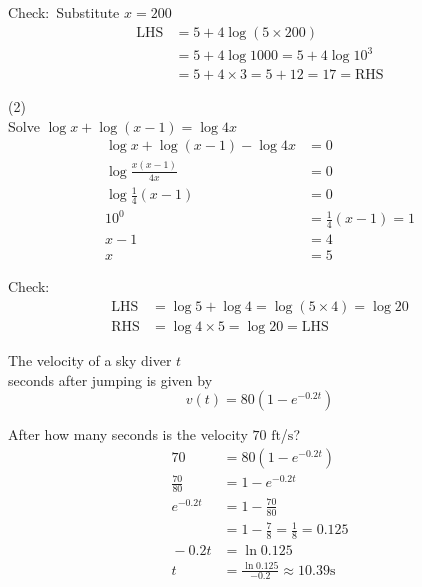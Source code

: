 Check:\ Substitute $x =200$
\begin{align*}\text{LHS} &  = 5 +4 \log  \left (5 \times 200\right ) \\
&  = 5 +4 \log  1000 =5 +4 \log  10^{3} \\
&  = 5 +4 \times 3 =5 +12 =17 =\text{RHS}\end{align*}

\begin{tasks}[label-width={6em}](2)
	\task[Example 3]\\
Solve $\log  x +\log  \left (x -1\right ) =\log  4 x$
\begin{align*}\log  x +\log  \left (x -1\right ) -\log  4 x &  = 0 \\
\log  \frac{x \left (x -1\right )}{4 x} &  = 0 \\
\log  \frac{1}{4} \left (x -1\right ) &  = 0 \\
\text{}10^{0} &  = \frac{1}{4} \left (x -1\right ) =1 \\
x -1 &  = 4 \\
x &  = 5\end{align*}

Check:
\begin{align*}\text{LHS} &  = \log  5 +\log  4 =\log  \left (5 \times 4\right ) =\log  20 \\
\text{RHS} &  = \log  4 \times 5 =\log  20 =\text{LHS}\end{align*}

\task[Example 4] The velocity of a sky diver $t$ \\seconds after jumping is given by
\begin{equation*}v \left (t\right ) =80 \left (1 -e^{ -0.2 t}\right )
\end{equation*}

After how many seconds is the velocity $70$ $\mbox{ft}$/$\mbox{s}$?
\begin{align*}70 &  = 80 \left (1 -e^{ -0.2 t}\right ) \\
\frac{70}{80} &  = 1 -e^{ -0.2 t} \\
e^{ -0.2 t} &  = 1 -\frac{70}{80} \\
&  = 1 -\frac{7}{8} =\frac{1}{8} =0.125 \\
\text{} -0.2 t &  = \ln  0.125 \\
t &  = \frac{\ln  0.125}{ -0.2} \approx 10.39\text{}\mbox{s}\end{align*}
\end{tasks}


